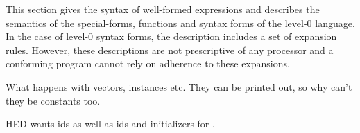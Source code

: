 %
\label{control-0}
%
\begin{optDefinition}
\noindent
This section gives the syntax of well-formed expressions and describes the
semantics of the special-forms, functions and syntax forms of the level-0
language.  In the case of level-0 syntax forms, the description includes a
set of expansion rules.  However, these descriptions are not prescriptive of any
processor and a conforming program cannot rely on adherence to these expansions.
\end{optDefinition}

%
\begin{optPrivate}
    What happens with vectors, instances etc.  They can be printed out, so why
    can't they be constants too.

    HED wants ids as well as ids and initializers for .
\end{optPrivate}
%
